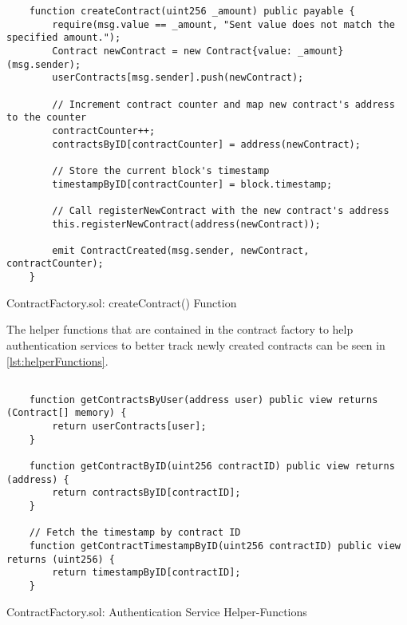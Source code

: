 \lstset{
  basicstyle=\footnotesize\ttfamily,
  breaklines=true,
  numbers=left,
  firstnumber=39,
}

\begin{Listing}
\begin{lstlisting}
    function createContract(uint256 _amount) public payable {
        require(msg.value == _amount, "Sent value does not match the specified amount.");
        Contract newContract = new Contract{value: _amount}(msg.sender);
        userContracts[msg.sender].push(newContract);

        // Increment contract counter and map new contract's address to the counter
        contractCounter++;
        contractsByID[contractCounter] = address(newContract);
        
        // Store the current block's timestamp
        timestampByID[contractCounter] = block.timestamp;

        // Call registerNewContract with the new contract's address
        this.registerNewContract(address(newContract));

        emit ContractCreated(msg.sender, newContract, contractCounter);
    }
\end{lstlisting}
  \caption{ContractFactory.sol: createContract() Function}
  \label{lst:createContract}
\end{Listing}



The helper functions that are contained in the contract factory to help authentication services to better track newly created contracts can be seen in \ref{lst:helperFunctions}.

\lstset{
  basicstyle=\footnotesize\ttfamily,
  breaklines=true,
  numbers=left,
  firstnumber=57
}

\begin{Listing}
\begin{lstlisting}

    function getContractsByUser(address user) public view returns (Contract[] memory) {
        return userContracts[user];
    }

    function getContractByID(uint256 contractID) public view returns (address) {
        return contractsByID[contractID];
    }

    // Fetch the timestamp by contract ID
    function getContractTimestampByID(uint256 contractID) public view returns (uint256) {
        return timestampByID[contractID];
    }

\end{lstlisting}
  \caption{ContractFactory.sol: Authentication Service Helper-Functions}
  \label{lst:helperFunctions}
\end{Listing}





